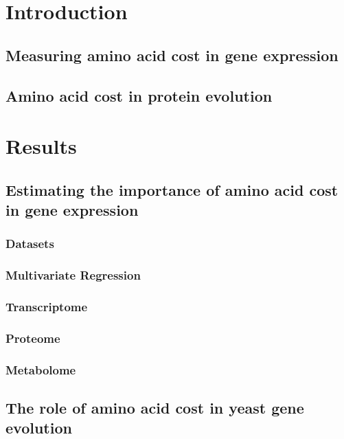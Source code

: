 \section{Introduction}

\subsection{Measuring amino acid cost in gene expression}

\subsection{Amino acid cost in protein evolution}

\section{Results}

\subsection{Estimating the importance of amino acid cost in gene expression}

\subsubsection{Datasets}

\subsubsection{Multivariate Regression}

\subsubsection{Transcriptome}

\subsubsection{Proteome}

\subsubsection{Metabolome}

\subsection{The role of amino acid cost in yeast gene evolution}

